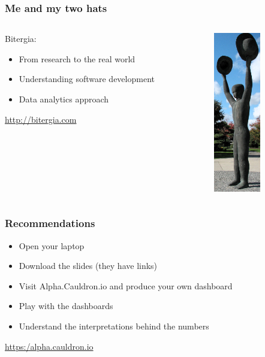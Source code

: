 \documentclass[17pt,aspectratio=169,hyperref=pdfusetitle]{beamer}
\begin{document}
\begin{frame}
\frametitle{Me and my two hats}

\begin{columns}[T]
\begin{column}{.80\textwidth}

Bitergia:

\begin{itemize}
\item From research to the real world
\item Understanding software development
\item Data analytics approach
\end{itemize}

\begin{flushright}
\url{http://bitergia.com}
\end{flushright}

\end{column}%
\hfill%
\begin{column}{.18\textwidth}
  \includegraphics[height=7cm]{figs/two-hats}
\end{column}%
\end{columns}

\end{frame}



\begin{frame}
\frametitle{Recommendations}

  \begin{itemize}
  \item Open your laptop
  \item Download the slides (they have links)
  \item Visit Alpha.Cauldron.io and produce your own dashboard
  \item Play with the dashboards
  \item Understand the interpretations behind the numbers
  \end{itemize}

  \begin{flushright}
    \url{https:/alpha.cauldron.io}
  \end{flushright}
\end{frame}
\end{document}
